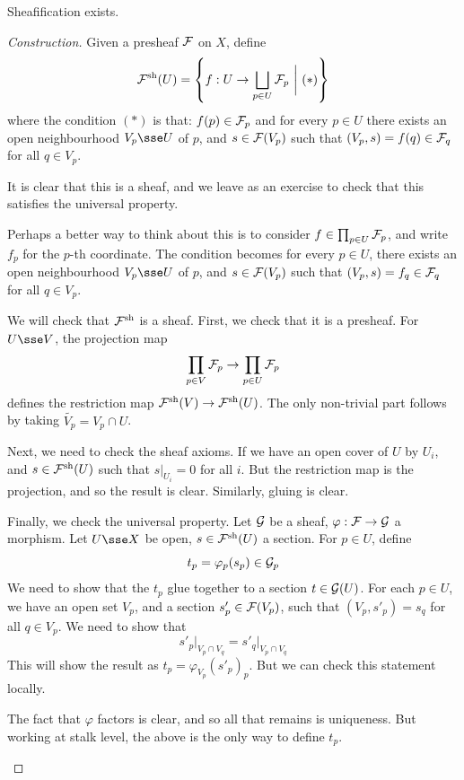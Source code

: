 \documentclass{article}
\begin{document}
\begin{proposition}
    Sheafification exists.
\end{proposition}

\begin{proof}
    [Construction] Given a presheaf \(\mathcal{F}\) on \(X\), define
    \[\mathcal{F}^{\operatorname{sh}}(U) = \left\{f : U \to \bigsqcup_{p \in U}\mathcal{F}_p \ \bigg\vert\ (*)\right\}\]
    where the condition \((*)\) is that:
    \(f(p) \in \mathcal{F}_p\) and for every \(p \in U\) there exists an open neighbourhood \(V_p \sse U\) of \(p\), and \(s \in \mathcal{F}(V_p)\) such that \((V_p, s) = f(q) \in \mathcal{F}_q\) for all \(q \in V_p\).

    It is clear that this is a sheaf, and we leave as an exercise to check that this satisfies the universal property.

    \begin{addendum}
        Perhaps a better way to think about this is to consider \(f \in \prod_{p \in U}\mathcal{F}_p\), and write \(f_p\) for the \(p\)-th coordinate. The condition becomes for every \(p \in U\), there exists an open neighbourhood \(V_p \sse U\) of \(p\), and \(s \in \mathcal{F}(V_p)\) such that \((V_p, s) = f_q \in \mathcal{F}_q\) for all \(q \in V_p\).

        We will check that \(\mathcal{F}^{\operatorname{sh}}\) is a sheaf. First, we check that it is a presheaf. For \(U \sse V\), the projection map
        \[\prod_{p \in V}\mathcal{F}_p \to \prod_{p \in U}\mathcal{F}_p\]
        defines the restriction map \(\mathcal{F}^{\operatorname{sh}}(V) \to \mathcal{F}^{\operatorname{sh}}(U)\). The only non-trivial part follows by taking \(\widetilde{V_p} = V_p \cap U\). 
        
        Next, we need to check the sheaf axioms. If we have an open cover of \(U\) by \(U_i\), and \(s \in \mathcal{F}^{\operatorname{sh}}(U)\) such that \(s \vert_{U_i} = 0\) for all \(i\). But the restriction map is the projection, and so the result is clear. Similarly, gluing is clear.

        Finally, we check the universal property. Let \(\mathcal{G}\) be a sheaf, \(\varphi : \mathcal{F} \to \mathcal{G}\) a morphism. Let \(U \sse X\) be open, \(s \in \mathcal{F}^{\operatorname{sh}}(U)\) a section. For \(p \in U\), define
        \[t_p = \varphi_p(s_p) \in \mathcal{G}_p\]
        We need to show that the \(t_p\) glue together to a section \(t \in \mathcal{G}(U)\). For each \(p \in U\), we have an open set \(V_p\), and a section \(s'_p \in \mathcal{F}(V_p)\), such that \((V_p, s'_p) = s_q\) for all \(q \in V_p\). We need to show that
        \[s'_p\vert_{V_p \cap V_q} = s'_q \vert_{V_p \cap V_q}\]
        This will show the result as \(t_p = \varphi_{V_p}(s'_p)_p\). But we can check this statement locally.

        The fact that \(\varphi\) factors is clear, and so all that remains is uniqueness. But working at stalk level, the above is the only way to define \(t_p\).
    \end{addendum}
\end{proof}
\end{document}
